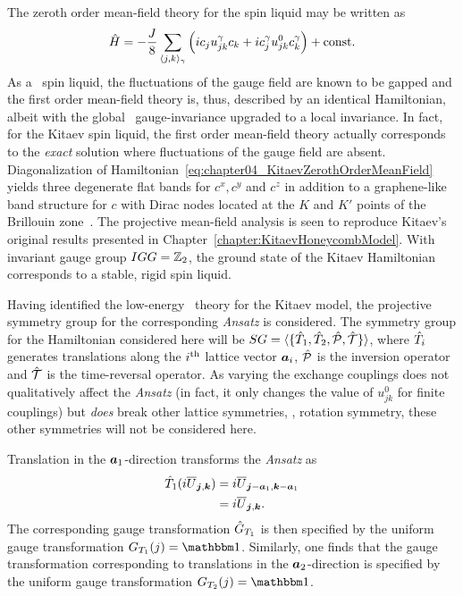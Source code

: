 The zeroth order mean-field theory for the spin liquid may be written as
%
\begin{equation}
	\hat{H} = -\frac{J}{8} \sum_{\langle j,k \rangle_{\gamma}} \left( i c_j u^{\gamma}_{jk} c_k + i c^{\gamma}_j u^0_{jk} c^{\gamma}_k \right) + {\rm const}.
	\label{eq:chapter04_KitaevZerothOrderMeanField}
\end{equation}
%
As a \ZZ~spin liquid, the fluctuations of the gauge field are known to be gapped and the first order mean-field theory is, thus, described by an identical Hamiltonian, albeit with the global \ZZ~gauge-invariance upgraded to a local invariance.
In fact, for the Kitaev spin liquid, the first order mean-field theory actually corresponds to the \textit{exact} solution where fluctuations of the gauge field are absent.
Diagonalization of Hamiltonian~\eqref{eq:chapter04_KitaevZerothOrderMeanField} yields three degenerate flat bands for $c^x, c^y$ and $c^z$ in addition to a graphene-like band structure for $c$ with Dirac nodes located at the $K$ and $K'$ points of the Brillouin zone~\cite{YouPRB2012,SeifertPRBFeb2018}.
The projective mean-field analysis is seen to reproduce Kitaev's original results presented in Chapter~\ref{chapter:KitaevHoneycombModel}.
With invariant gauge group $IGG = \mathbb{Z}_{2}$, the ground state of the Kitaev Hamiltonian corresponds to a stable, rigid spin liquid.

Having identified the low-energy \ZZ~theory for the Kitaev model, the projective symmetry group for the corresponding \textit{Ansatz} is considered.
The symmetry group for the Hamiltonian considered here will be $SG = \langle \{ \hat{T}_1, \hat{T}_2, \hat{\mathcal{P}}, \hat{\mathcal{T}} \} \rangle$, where $\hat{T}_i$ generates translations along the $i^{\rm th}$ lattice vector $\bm{a}_i$, $\hat{\mathcal{P}}$ is the inversion operator and $\hat{\mathcal{T}}$ is the time-reversal operator.
As varying the exchange couplings does not qualitatively affect the \textit{Ansatz} (in fact, it only changes the value of $u^0_{jk}$ for finite couplings) but \textit{does} break other lattice symmetries, \eg, rotation symmetry, these other symmetries will not be considered here.

Translation in the $\bm{a}_1$-direction transforms the \textit{Ansatz} as
%
\begin{align}
	\hat{T}_1 (i \overline{U}_{\bm{j}, \bm{k}})	&= i \overline{U}_{\bm{j}-\bm{a}_1, \bm{k}-\bm{a}_1} \nonumber\\
												&= i \overline{U}_{\bm{j}, \bm{k}}.
\end{align} 
%
The corresponding gauge transformation $\hat{G}_{T_1}$ is then specified by the uniform gauge transformation $G_{T_1}(j) = \id$.
Similarly, one finds that the gauge transformation corresponding to translations in the $\bm{a}_2$-direction is specified by the uniform gauge transformation $G_{T_2}(j) = \id$.

